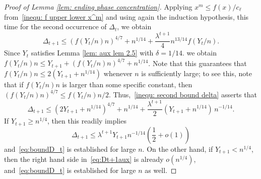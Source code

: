 \documentclass[10pt,a4paper]{amsart}
\begin{document}
\begin{proof}[Proof of Lemma \ref{lem: ending phase concentration}]
Applying $x^m\leq f(x)/c_\ell$ from~\eqref{inequ: f upper lower x^m} and using again the induction hypothesis, this time for the second occurrence of $\Delta_t$, we obtain
    \begin{equation}\label{inequ: second bound delta}
        \Delta_{t+1} \leq (f(Y_t/n)n)^{4/7} + n^{1/14} + \frac{\lambda^{t+1}}{4}  n^{13/14}f(Y_t/n).
    \end{equation}
Since $Y_t$ satisfies Lemma \ref{lem: aux lem 2.5} with $\delta=1/14$. we obtain
$f(Y_t/n)n \leq Y_{t+1}+\left(f(Y_t/n)n\right)^{4/7}+n^{1/14}$.
Note that this guarantees that $f(Y_t/n)n \le 2(Y_{t+1} + n^{1/14})$ whenever $n$ is sufficiently large; to see this, note that if $f(Y_t/n)n$ is larger than some specific constant, then $(f(Y_t/n)n)^{4/7} \le f(Y_t/n)n/2$. Thus,~\eqref{inequ: second bound delta} asserts that
\begin{equation}
\label{eq:Dt+1aux}
    \Delta_{t+1} \leq \left(2Y_{t+1} + n^{1/14}\right)^{4/7} + n^{1/14} + \frac{\lambda^{t+1}}{2} (Y_{t+1} + n^{1/14})\, n^{-1/14}.
\end{equation}
If $Y_{t+1} \ge n^{1/4}$, then this readily implies 
\[
    \Delta_{t+1}
    \le {\lambda^{t+1}}Y_{t+1}n^{-1/14} \left(\frac12 + o(1)\right)
\]
and~\eqref{eq:boundD_t} is established for large $n$. On the other hand, if $Y_{t+1} < n^{1/4}$, then the right hand side in~\eqref{eq:Dt+1aux} is already $o(n^{1/4})$, and~\eqref{eq:boundD_t} is established for large $n$ as well.
\end{proof}
\end{document}
